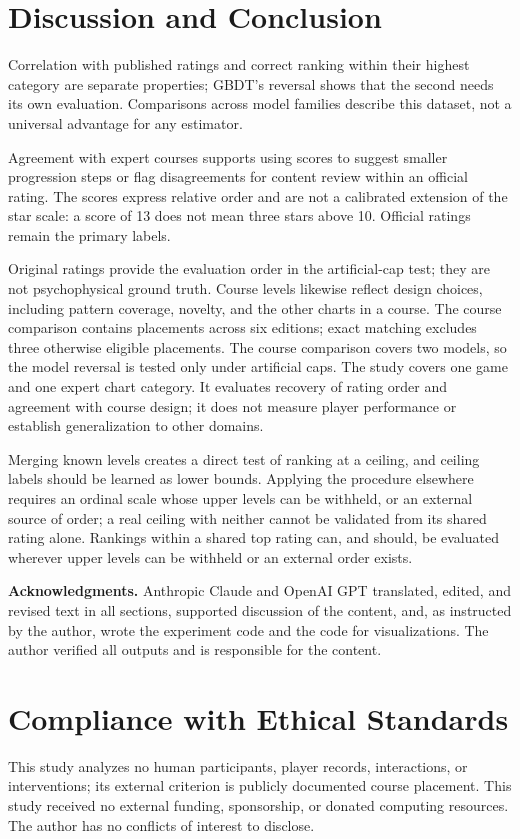 \documentclass{article}
\begin{document}
\section{Discussion and Conclusion}
Correlation with published ratings and correct ranking within their
highest category are separate properties; GBDT's reversal shows that the
second needs its own evaluation. Comparisons across model families describe
this dataset, not a universal advantage for any estimator.

Agreement with expert courses supports using scores to suggest smaller
progression steps or flag disagreements for content review within an official
rating. The scores express relative order and are not a calibrated extension
of the star scale: a score of 13 does not mean three stars above 10. Official
ratings remain the primary labels.

Original ratings provide the evaluation order in the artificial-cap test;
they are not psychophysical ground truth. Course levels likewise reflect
design choices, including pattern coverage, novelty, and the other charts in
a course. The course comparison contains \DojoPlacementCount{} placements
across six editions; exact matching excludes three otherwise eligible
placements. The course comparison covers two models, so
the model reversal is tested only under artificial caps. The study covers one
game and one expert chart category. It evaluates recovery of rating order and
agreement with course design; it does not measure player performance or
establish generalization to other domains.

Merging known levels creates a direct test of ranking at a ceiling, and
ceiling labels should be learned as lower bounds. Applying the
procedure elsewhere requires an ordinal scale whose upper levels can be
withheld, or an external source of order; a real ceiling with neither cannot
be validated from its shared rating alone. Rankings within a shared top rating
can, and should, be evaluated wherever upper levels can be withheld or an
external order exists.

\medskip
\noindent\textbf{Acknowledgments.} Anthropic Claude and OpenAI GPT
translated, edited, and revised text in all sections, supported discussion of
the content, and, as instructed by the author, wrote the experiment code and
the code for visualizations. The author verified all outputs and is responsible
for the content.

\clearpage
\section*{Compliance with Ethical Standards}
This study analyzes no human participants, player records, interactions, or
interventions; its external criterion is publicly documented course placement.
This study received no external funding, sponsorship, or donated computing
resources. The author has no conflicts of interest to disclose.



\end{document}

